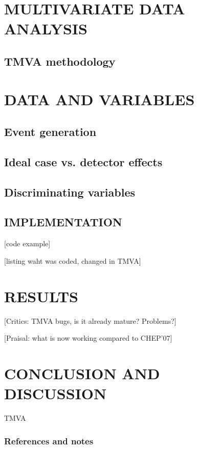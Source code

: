 \documentclass[twoside,floatfix,a4wide]{revtex4}
\begin{document}
\section{MULTIVARIATE DATA ANALYSIS}
\subsection{TMVA methodology}


\section{DATA AND VARIABLES}
\subsection{Event generation}
\subsection{Ideal case vs. detector effects}
\subsection{Discriminating variables}


\subsection{IMPLEMENTATION \label{section:implementation}}
[code example]

[listing waht was coded, changed in TMVA]

\section{RESULTS} \label{sec:example}
[Critics: TMVA bugs, is it already mature? Problems?]

[Praisal: what is now working compared to CHEP'07]

\section{CONCLUSION AND DISCUSSION} \label{sec:conclusion}
TMVA



\subsubsection{References and notes}


\end{document}

